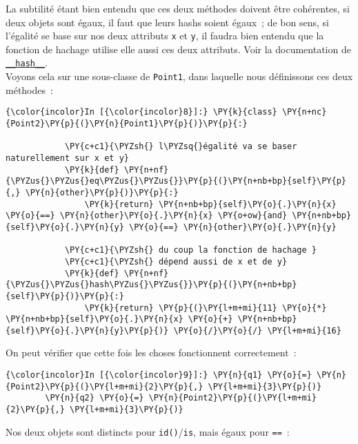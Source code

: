 La subtilité étant bien entendu que ces deux méthodes doivent être
cohérentes, si deux objets sont égaux, il faut que leurs hashs soient
égaux~; de bon sens, si l'égalité se base sur nos deux attributs
\texttt{x} et \texttt{y}, il faudra bien entendu que la fonction de
hachage utilise elle aussi ces deux attributs. Voir la documentation de
\href{https://docs.python.org/3/reference/datamodel.html?highlight=__hash__\#object.__hash__}{\texttt{\_\_hash\_\_}}.\\

    Voyons cela sur une sous-classe de \texttt{Point1}, dans laquelle nous
définissons ces deux méthodes~:

    \begin{Verbatim}[commandchars=\\\{\}]
{\color{incolor}In [{\color{incolor}8}]:} \PY{k}{class} \PY{n+nc}{Point2}\PY{p}{(}\PY{n}{Point1}\PY{p}{)}\PY{p}{:}
        
            \PY{c+c1}{\PYZsh{} l\PYZsq{}égalité va se baser naturellement sur x et y}
            \PY{k}{def} \PY{n+nf}{\PYZus{}\PYZus{}eq\PYZus{}\PYZus{}}\PY{p}{(}\PY{n+nb+bp}{self}\PY{p}{,} \PY{n}{other}\PY{p}{)}\PY{p}{:}
                \PY{k}{return} \PY{n+nb+bp}{self}\PY{o}{.}\PY{n}{x} \PY{o}{==} \PY{n}{other}\PY{o}{.}\PY{n}{x} \PY{o+ow}{and} \PY{n+nb+bp}{self}\PY{o}{.}\PY{n}{y} \PY{o}{==} \PY{n}{other}\PY{o}{.}\PY{n}{y}
        
            \PY{c+c1}{\PYZsh{} du coup la fonction de hachage }
            \PY{c+c1}{\PYZsh{} dépend aussi de x et de y}
            \PY{k}{def} \PY{n+nf}{\PYZus{}\PYZus{}hash\PYZus{}\PYZus{}}\PY{p}{(}\PY{n+nb+bp}{self}\PY{p}{)}\PY{p}{:}
                \PY{k}{return} \PY{p}{(}\PY{l+m+mi}{11} \PY{o}{*} \PY{n+nb+bp}{self}\PY{o}{.}\PY{n}{x} \PY{o}{+} \PY{n+nb+bp}{self}\PY{o}{.}\PY{n}{y}\PY{p}{)} \PY{o}{/}\PY{o}{/} \PY{l+m+mi}{16}
\end{Verbatim}


    On peut vérifier que cette fois les choses fonctionnent correctement~:

    \begin{Verbatim}[commandchars=\\\{\}]
{\color{incolor}In [{\color{incolor}9}]:} \PY{n}{q1} \PY{o}{=} \PY{n}{Point2}\PY{p}{(}\PY{l+m+mi}{2}\PY{p}{,} \PY{l+m+mi}{3}\PY{p}{)}
        \PY{n}{q2} \PY{o}{=} \PY{n}{Point2}\PY{p}{(}\PY{l+m+mi}{2}\PY{p}{,} \PY{l+m+mi}{3}\PY{p}{)}
\end{Verbatim}


    Nos deux objets sont distincts pour \texttt{id()}/\texttt{is}, mais
égaux pour \texttt{==}~:

